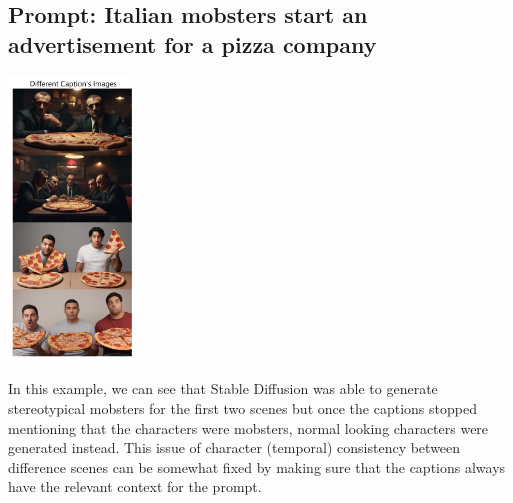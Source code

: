 \documentclass[conference]{IEEEtran}
\begin{document}
\subsection{\textbf{Prompt}: Italian mobsters start an advertisement for a pizza company}

\begin{center}
\includegraphics[width=0.25\textwidth]{imgs/final-intermediate/pizza.png}
\end{center}

In this example, we can see that Stable Diffusion was able to generate 
stereotypical mobsters for the first two scenes but once the captions
stopped mentioning that the characters were mobsters, normal
looking characters were generated instead. This issue of
character (temporal) consistency between difference scenes
can be somewhat fixed by making sure that the captions always have
the relevant context for the prompt.

\end{document}
